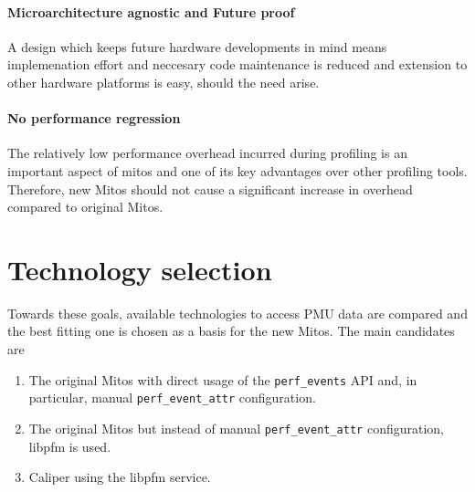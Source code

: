 \paragraph{Microarchitecture agnostic and Future proof}
A design which keeps future hardware developments in mind means implemenation effort and neccesary code maintenance is reduced and extension to other hardware platforms is easy, should the need arise.

\paragraph{No performance regression}
The relatively low performance overhead incurred during profiling is an important aspect of mitos and one of its key advantages over other profiling tools. Therefore, new Mitos should not cause a significant increase in overhead compared to original Mitos.

\section{Technology selection}\label{sec:tech-selection}
Towards these goals, available technologies to access PMU data are compared and the best fitting one is chosen as a basis for the new Mitos. The main candidates are
\begin{enumerate}[label=\Alph*)]
    \item\label{techcomp:bare} The original Mitos with direct usage of the \texttt{perf\_events} API and, in particular, manual \texttt{perf\_event\_attr} configuration.
    \item\label{techcomp:libpfm} The original Mitos but instead of manual \texttt{perf\_event\_attr} configuration, libpfm is used.
    \item\label{techcomp:caliper} Caliper using the libpfm service.
\end{enumerate}

